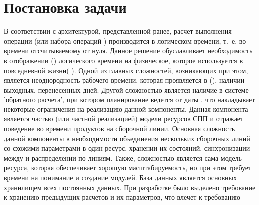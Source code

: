 \section{Постановка задачи}
В соответствии с архитектурой, представленной ранее, расчет выполнения операции
(или набора операций ) производится в логическом времени,
т.~е. во времени отсчитываемому от нуля. Данное решение обуславливает необходимость в
отображении () логического времени на физическое, 
которое используется в повседневной жизни( ).
Одной из главных сложностей, возникающих при этом, является неоднородность рабочего 
времени, которая проявляется в (), 
наличии выходных, перенесенных дней. Другой сложностью является наличие в системе 'обратного расчета', при котором планирование ведется от даты , что накладывает некоторые ограничения на реализацию данной компоненты.
Данная компонента является частью (или частной реализацией) модели ресурсов СПП и отражает поведение во времени продуктов на сборочной линии. Основная сложность данной компоненты в необходимости объединения нескольких сборочных линий со схожими параметрами в один ресурс, хранении их состояний, синхронизации между  и распределении  по линиям. Также, сложностью является сама модель ресурса, которая обеспечивает хорошую масштабируемость, но при этом требует времени на понимание и создание модулей.
База данных является основных хранилищем всех постоянных  данных. При разработке было выделено требование к хранению  предыдущих расчетов и их параметров, что влечет к требованию  